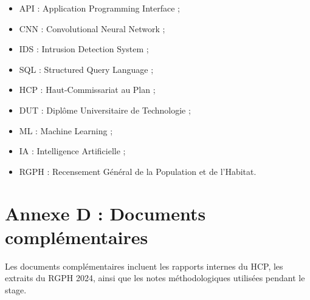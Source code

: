 \documentclass[12pt,a4paper,oneside]{report}
\begin{document}
\begin{itemize}[leftmargin=*]
  \item API : Application Programming Interface ;
  \item CNN : Convolutional Neural Network ;
  \item IDS : Intrusion Detection System ;
  \item SQL : Structured Query Language ;
  \item HCP : Haut-Commissariat au Plan ;
  \item DUT : Diplôme Universitaire de Technologie ;
  \item ML : Machine Learning ;
  \item IA : Intelligence Artificielle ;
  \item RGPH : Recensement Général de la Population et de l'Habitat.
\end{itemize}

\chapter{Annexe D : Documents complémentaires}

Les documents complémentaires incluent les rapports internes du HCP, les extraits du RGPH 2024, ainsi que les notes méthodologiques utilisées pendant le stage.
\end{document}

